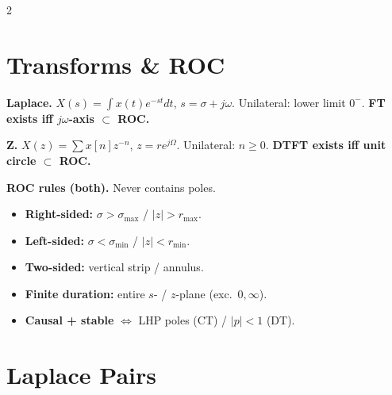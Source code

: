 \documentclass[12pt]{extarticle}
\begin{document}
\begin{multicols*}{2}
\raggedcolumns  %

\section*{Transforms \& ROC}

\textbf{Laplace.} $X(s)=\!\int x(t)e^{-st}dt$, $s=\sigma+j\omega$. Unilateral: lower limit $0^-$. \textbf{FT exists iff $j\omega$-axis $\subset$ ROC.}

\textbf{Z.} $X(z)=\!\sum x[n]z^{-n}$, $z=re^{j\Omega}$. Unilateral: $n\ge 0$. \textbf{DTFT exists iff unit circle $\subset$ ROC.}

\textbf{ROC rules (both).} Never contains poles.
\begin{itemize}
\item \textbf{Right-sided:} $\sigma>\sigma_{\max}$ / $|z|>r_{\max}$.
\item \textbf{Left-sided:} $\sigma<\sigma_{\min}$ / $|z|<r_{\min}$.
\item \textbf{Two-sided:} vertical strip / annulus.
\item \textbf{Finite duration:} entire $s$- / $z$-plane (exc.\ $0,\infty$).
\item \textbf{Causal + stable} $\Leftrightarrow$ LHP poles (CT) / $|p|<1$ (DT).
\end{itemize}

\section*{Laplace Pairs}


\end{multicols*}
\end{document}
